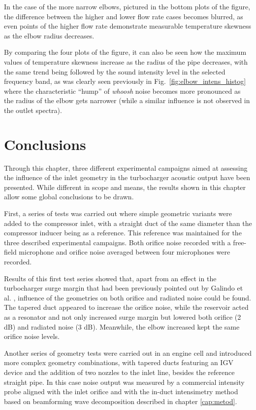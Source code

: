 In the case of the more narrow elbows, pictured in the bottom plots of the figure, the difference between the higher and lower flow rate cases becomes blurred, as even points of the higher flow rate demonstrate measurable temperature skewness as the elbow radius decreases. 

By comparing the four plots of the figure, it can also be seen how the maximum values of temperature skewness increase as the radius of the pipe decreases, with the same trend being followed by the sound intensity level in the selected frequency band, as was clearly seen previously in Fig.~\ref{fig:elbow_intens_histog} where the characteristic ``hump'' of \emph{whoosh} noise becomes more pronounced as the radius of the elbow gets narrower (while a similar influence is not observed in the outlet spectra).

\section{Conclusions}

Through this chapter, three different experimental campaigns aimed at assessing the influence of the inlet geometry in the turbocharger acoustic output have been presented. While different in scope and means, the results shown in this chapter allow some global conclusions to be drawn.

First, a series of tests was carried out where simple geometric variants were added to the compressor inlet, with a straight duct of the same diameter than the compressor inducer being as a reference. This reference was maintained for the three described experimental campaigns. Both orifice noise recorded with a free-field microphone and orifice noise averaged between four microphones were recorded.

Results of this first test series showed that, apart from an effect in the turbocharger surge margin that had been previously pointed out by Galindo et al. \cite{galindo2007potential}, influence of the geometries on both orifice and radiated noise could be found. The tapered duct appeared to increase the orifice noise, while the reservoir acted as a resonator and not only increased surge margin but lowered both orifice (2 dB) and radiated noise (3 dB). Meanwhile, the elbow increased kept the same orifice noise levels.

Another series of geometry tests were carried out in an engine cell and introduced more complex geometry combinations, with tapered ducts featuring an IGV device and the addition of two nozzles to the inlet line, besides the reference straight pipe. In this case noise output was measured by a commercial intensity probe aligned with the inlet orifice and with the in-duct intensimetry method based on beamforming wave decomposition described in chapter \ref{cap:metod}.

